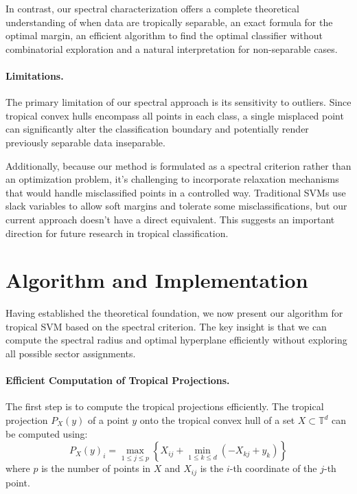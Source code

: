 \documentclass{article}
\newcommand{\trop}{\mathbb{T}}
\begin{document}
In contrast, our spectral characterization offers a complete theoretical understanding of when data are tropically separable, an exact formula for the optimal margin, an efficient algorithm to find the optimal classifier without combinatorial exploration and a natural interpretation for non-separable cases.

\paragraph{Limitations.} 
The primary limitation of our spectral approach is its sensitivity to outliers. Since tropical convex hulls encompass all points in each class, a single misplaced point can significantly alter the classification boundary and potentially render previously separable data inseparable.

Additionally, because our method is formulated as a spectral criterion rather than an optimization problem, it's challenging to incorporate relaxation mechanisms that would handle misclassified points in a controlled way. Traditional SVMs use slack variables to allow soft margins and tolerate some misclassifications, but our current approach doesn't have a direct equivalent. This suggests an important direction for future research in tropical classification.

\section{Algorithm and Implementation}\label{sec:algorithm}

Having established the theoretical foundation, we now present our algorithm for tropical SVM based on the spectral criterion. The key insight is that we can compute the spectral radius and optimal hyperplane efficiently without exploring all possible sector assignments.

\paragraph{Efficient Computation of Tropical Projections.}
\label{subsec:computing_projections}
The first step is to compute the tropical projections efficiently. The tropical projection $P_X(y)$ of a point $y$ onto the tropical convex hull of a set $X \subset \trop^d$ can be computed using:
\[
P_X(y)_i = \max_{1 \leq j \leq p} \left\{X_{ij} + \min_{1 \leq k \leq d} \left(-X_{kj} + y_k\right)\right\}
\]
where $p$ is the number of points in $X$ and $X_{ij}$ is the $i$-th coordinate of the $j$-th point.
\end{document}
